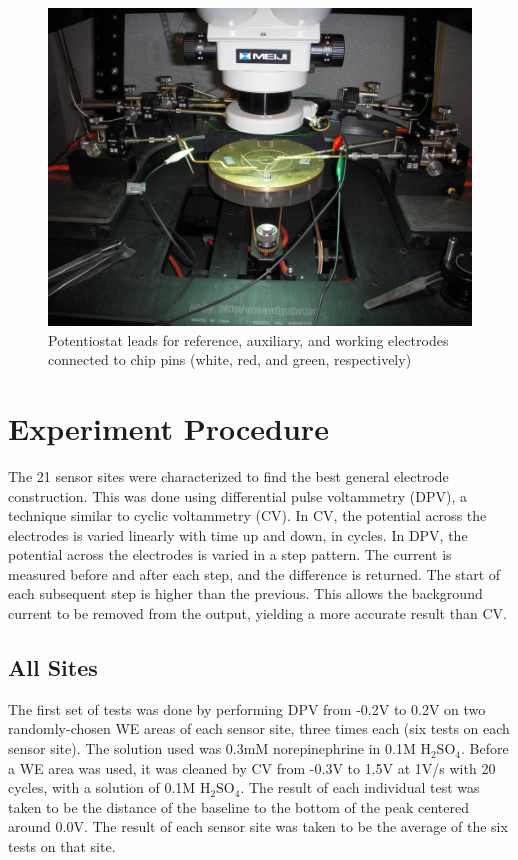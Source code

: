 \begin{figure}
	\centering
	\includegraphics[width=0.5\linewidth]{figures/potentiostatleads.png}
	\caption[Potentiostat leads connected to pins]{Potentiostat leads for reference, auxiliary, and working electrodes connected to chip pins (white, red, and green, respectively)}
	\label{potentiostatleads}
\end{figure}

\section{Experiment Procedure}

The 21 sensor sites were characterized to find the best general electrode construction. This was done using differential pulse voltammetry (DPV), a technique similar to cyclic voltammetry (CV). In CV, the potential across the electrodes is varied linearly with time up and down, in cycles. In DPV, the potential across the electrodes is varied in a step pattern. The current is measured before and after each step, and the difference is returned. The start of each subsequent step is higher than the previous. This allows the background current to be removed from the output, yielding a more accurate result than CV.

\subsection{All Sites}

The first set of tests was done by performing DPV from -0.2V to 0.2V on two randomly-chosen WE areas of each sensor site, three times each (six tests on each sensor site). The solution used was 0.3mM norepinephrine in 0.1M $\mathrm{H}_2\mathrm{SO}_4$. Before a WE area was used, it was cleaned by CV from -0.3V to 1.5V at 1V/s with 20 cycles, with a solution of 0.1M $\mathrm{H}_2\mathrm{SO}_4$. The result of each individual test was taken to be the distance of the baseline to the bottom of the peak centered around 0.0V. The result of each sensor site was taken to be the average of the six tests on that site.

